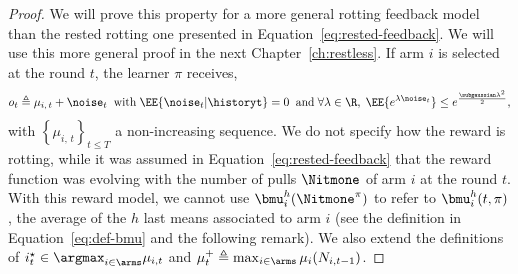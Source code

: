 \begin{proof}
We will prove this property for a more general rotting feedback model than the rested rotting one presented in Equation~\ref{eq:rested-feedback}. We will use this more general proof in the next Chapter~\ref{ch:restless}. If arm $i$ is selected at the round $t$, the learner $\pi$ receives,
\[
o_t \triangleq \mu_{i, \, t} + \noise_t  \;\; \text{with}\; \EE{ \noise_t | \historyt }= 0 \;\; \text{and} \; \forall \lambda \in \R, \; \EE{ e^{\lambda\noise_t}} \leq e^{\frac{\subgaussian\lambda^2}{2}},
\]
with $\left\{ \mu_{i, \, t}\right\}_{t\leq T}$ a non-increasing sequence. We do not specify how the reward is rotting, while it was assumed in Equation~\ref{eq:rested-feedback} that the reward function was evolving with the number of pulls $\Nitmone$ of arm $i$ at the round $t$. With this reward model, we cannot use $\bmu^{h}_{i}(\Nitmone^{\pi})$ to refer to $\bmu_i^h(t,\pi)$, the average of the $h$ last means associated to arm $i$ (see the definition in Equation~\ref{eq:def-bmu} and the following remark). We also extend the definitions of $i_t^\star \in \argmax_{i\in \arms} \mu_{i,t}$ and $\mu_t^+ \triangleq \max_{i \in \arms} \mu_i(N_{i,t-1})$.


\end{proof}
